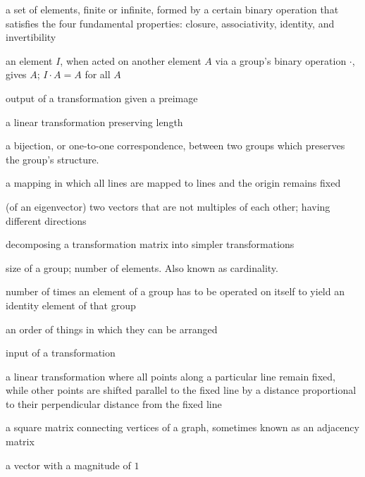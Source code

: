 \documentclass[../gatm.tex]{subfiles}
\begin{document}
\begin{description}[align=left]
\item[group] a set of elements, finite or infinite, formed by a certain binary operation that satisfies the four fundamental properties: closure, associativity, identity, and invertibility

\item[identity element] an element $I$, when acted on another element $A$ via a group's binary operation $\cdot$, gives $A$; $I\cdot A = A$ for all $A$

\item[image] output of a transformation given a preimage

\item[isometry] a linear transformation preserving length

\item[isomorphism] a bijection, or one-to-one correspondence, between two groups which preserves the group's structure.

\item[linear mapping] a mapping in which all lines are mapped to lines and the origin remains fixed

\item[linearly independent] (of an eigenvector) two vectors that are not multiples of each other; having different directions

\item[matrix decomposition] decomposing a transformation matrix into simpler transformations

\item[order] size of a group; number of elements. Also known as cardinality.

\item[period] number of times an element of a group has to be operated on itself to yield an identity element of that group

\item[permutation] an order of things in which they can be arranged

\item[preimage] input of a transformation

\item[shear] a linear transformation where all points along a particular line remain fixed, while other points are shifted parallel to the fixed line by a distance proportional to their perpendicular distance from the fixed line

\item[transportation matrix] a square matrix connecting vertices of a graph, sometimes known as an adjacency matrix

\item[unit vector] a vector with a magnitude of $1$

\end{description}
\end{document}
